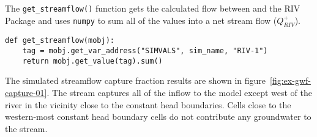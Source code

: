 \noindent The \texttt{get\_streamflow()} function gets the calculated flow between \MF and the RIV Package and uses \texttt{numpy} to sum all of the values into a net stream flow ($Q_{RIV}^{+}$). 

\begin{lstlisting}
def get_streamflow(mobj):
    tag = mobj.get_var_address("SIMVALS", sim_name, "RIV-1")
    return mobj.get_value(tag).sum()
\end{lstlisting}

The simulated streamflow capture fraction results are shown in figure~\ref{fig:ex-gwf-capture-01}. The stream captures all of the inflow to the model except west of the river in the vicinity close to the constant head boundaries. Cells close to the western-most constant head boundary cells do not contribute any groundwater to the stream.


